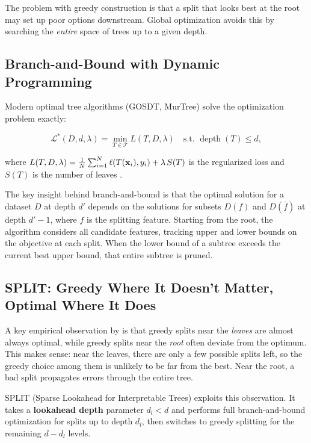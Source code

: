 The problem with greedy construction is that a split that looks best at the
root may set up poor options downstream.  Global optimization avoids this
by searching the \emph{entire} space of trees up to a given depth.

\subsection{Branch-and-Bound with Dynamic Programming}

Modern optimal tree algorithms (GOSDT, MurTree) solve the optimization
problem exactly:

\begin{equation}\label{eq:optimal-tree}
  \mathcal{L}^*(D, d, \lambda) = \min_{T \in \mathcal{T}}
    L(T, D, \lambda) \quad \text{s.t. } \operatorname{depth}(T) \leq d,
\end{equation}

\noindent where $L(T, D, \lambda) = \frac{1}{N}\sum_{i=1}^{N}
\ell(T(\mathbf{x}_i), y_i) + \lambda\,S(T)$ is the regularized loss and
$S(T)$ is the number of leaves \citep{BabbarEtAl2025}.

The key insight behind branch-and-bound is that the optimal solution for
a dataset $D$ at depth $d'$ depends on the solutions for subsets $D(f)$ and
$D(\bar{f})$ at depth $d'-1$, where $f$ is the splitting feature.  Starting
from the root, the algorithm considers all candidate features, tracking
upper and lower bounds on the objective at each split.  When the lower bound
of a subtree exceeds the current best upper bound, that entire subtree is
pruned.

\subsection{SPLIT: Greedy Where It Doesn't Matter, Optimal Where It Does}

A key empirical observation by \citet{BabbarEtAl2025} is that greedy
splits near the \emph{leaves} are almost always optimal, while greedy splits
near the \emph{root} often deviate from the optimum.  This makes sense: near
the leaves, there are only a few possible splits left, so the greedy choice
among them is unlikely to be far from the best.  Near the root, a bad split
propagates errors through the entire tree.

SPLIT (Sparse Lookahead for Interpretable Trees) exploits this observation.
It takes a \textbf{lookahead depth} parameter $d_l < d$ and performs full
branch-and-bound optimization for splits up to depth $d_l$, then switches to
greedy splitting for the remaining $d - d_l$ levels.

